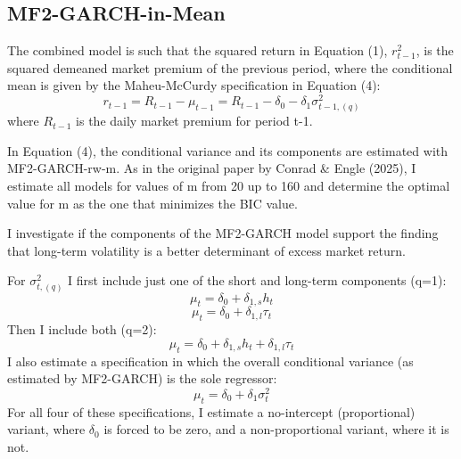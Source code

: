 \documentclass[12pt]{article}
\begin{document}
\subsection{MF2-GARCH-in-Mean}
The combined model is such that the squared return in Equation (1), $r_{t-1}^2$,  is the squared demeaned market premium of the previous period, where the conditional mean is given by the Maheu-McCurdy specification in Equation (4):
\begin{equation}
\nonumber
r_{t-1}=R_{t-1}-\mu_{t-1}=R_{t-1}-\delta_0-\delta_1\sigma_{t-1,(q)}^2
\end{equation}
where $R_{t-1}$ is the daily market premium for period t-1.\par
In Equation (4), the conditional variance and its components are estimated with MF2-GARCH-rw-m. As in the original paper by Conrad \& Engle (2025), I estimate all models for values of m from 20 up to 160 and determine the optimal value for m as the one that minimizes the BIC value.\par
I investigate if the components of the MF2-GARCH model support the finding that long-term volatility is a better determinant of excess market return.\par
For $\sigma_{t,(q)}^2$ I first include just one of the short and long-term components (q=1):
\begin{equation}
\nonumber
\mu_t=\delta_0+\delta_{1,s}h_t
\end{equation}
\begin{equation}
\nonumber
\mu_t=\delta_0+\delta_{1,l}\tau_t
\end{equation}
Then I include both (q=2):
\begin{equation}
\nonumber
\mu_t=\delta_0+\delta_{1,s}h_t+\delta_{1,l}\tau_t
\end{equation}
I also estimate a specification in which the overall conditional variance (as estimated by MF2-GARCH) is the sole regressor:
\begin{equation}
\nonumber
\mu_t=\delta_0+\delta_1\sigma_t^2
\end{equation}
For all four of these specifications, I estimate a no-intercept (proportional) variant, where $\delta_0$ is forced to be zero, and a non-proportional variant, where it is not.
\end{document}
